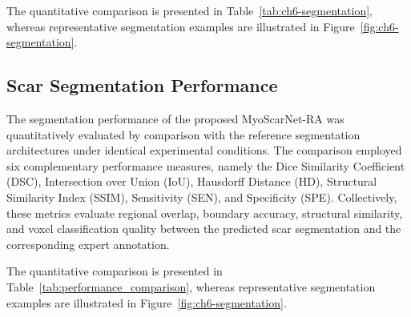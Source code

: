 The quantitative comparison is presented in Table~\ref{tab:ch6-segmentation}, whereas representative segmentation examples are illustrated in Figure~\ref{fig:ch6-segmentation}.

\subsection{Scar Segmentation Performance}
\label{subsec:ch6-performance}

The segmentation performance of the proposed MyoScarNet-RA was quantitatively evaluated by comparison with the reference segmentation architectures under identical experimental conditions. The comparison employed six complementary performance measures, namely the Dice Similarity Coefficient (DSC), Intersection over Union (IoU), Hausdorff Distance (HD), Structural Similarity Index (SSIM), Sensitivity (SEN), and Specificity (SPE). Collectively, these metrics evaluate regional overlap, boundary accuracy, structural similarity, and voxel classification quality between the predicted scar segmentation and the corresponding expert annotation.

The quantitative comparison is presented in Table~\ref{tab:performance_comparison}, whereas representative segmentation examples are illustrated in Figure~\ref{fig:ch6-segmentation}.

